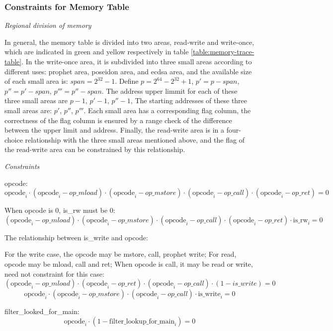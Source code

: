 \subsubsection{Constraints for Memory Table} \label{sec:memory-constraints}

\emph{Regional division of memory}

In general, the memory table is divided into two areas, read-write and write-once, which are indicated in green and yellow respectively in table \ref{table:memory-trace-table}.
In the write-once area, it is subdivided into three small areas according to different uses: prophet area, poseidon area, and ecdsa area, and the available size of each small area is:
$span = 2^{32} - 1$. Define $p =2^{64} - 2^{32} + 1$, $p'=p-span$, $p''=p'-span$, $p'''=p''-span$. The address upper limmit for each of these three small areas are $p-1$, $p'-1$, $p''-1$,
The starting addresses of these three small areas are: $p'$, $p''$, $p'''$. Each small area has a corresponding flag column, the correctness of the flag column is ensured by a
range check of the difference between the upper limit and address. Finally, the read-write area is in a four-choice relationship with the three small areas mentioned above, and the
flag of the read-write area can be constrained by this relationship.

\emph{Constraints}

opcode:
\[\mathrm{opcode}_i \cdot (\mathrm{opcode}_i - op\_mload) \cdot (\mathrm{opcode}_i-op\_mstore) \cdot (\mathrm{opcode}_i-op\_call) \cdot (\mathrm{opcode}_i-op\_ret)=0 \]

When opcode is 0, is\_rw must be 0:
\[ (\mathrm{opcode}_i-op\_mload) \cdot (\mathrm{opcode}_i-op\_mstore) \cdot (\mathrm{opcode}_i-op\_call) \cdot (\mathrm{opcode}_i-op\_ret) \cdot \mathrm{is\_rw}_i=0 \]

The relationship between is\_write and opcode:

For the write case, the opcode may be mstore, call, prophet write; For read, opcode may be mload, call and ret; When opcode is call, it may be read or write, need not constraint for this case:
\[ (\mathrm{opcode}_i-op\_mload) \cdot (\mathrm{opcode}_i - op\_ret) \cdot (\mathrm{opcode}_i - op\_call) \cdot (1-is\_write) = 0 \]
\[ \mathrm{opcode}_i \cdot (\mathrm{opcode}_i - op\_mstore) \cdot (\mathrm{opcode}_i - op\_call) \cdot \mathrm{is\_write}_i=0 \]

filter\_looked\_for\_main:
\[ \mathrm{opcode}_i \cdot (1-\mathrm{filter\_lookup\_for\_main}_i)=0 \]

